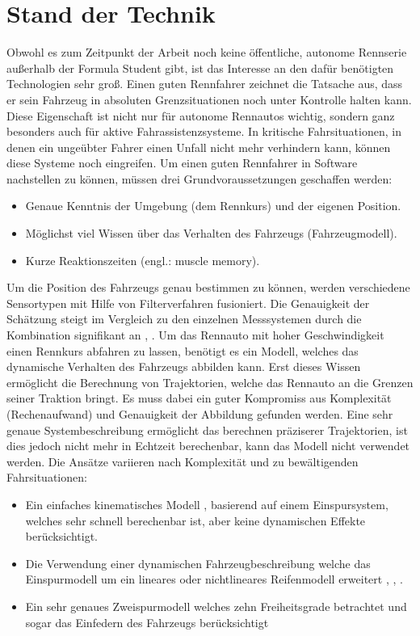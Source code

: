 \documentclass{like}
\begin{document}
\chapter{Stand der Technik}
Obwohl es zum Zeitpunkt der Arbeit noch keine öffentliche, autonome Rennserie außerhalb der Formula Student gibt, ist das Interesse an den dafür benötigten Technologien sehr groß.
Einen guten Rennfahrer zeichnet die Tatsache aus, dass er sein Fahrzeug in absoluten Grenzsituationen noch unter Kontrolle halten kann. Diese Eigenschaft ist nicht nur für autonome Rennautos wichtig, sondern ganz besonders auch für aktive Fahrassistenzsysteme. In kritische Fahrsituationen, in denen ein ungeübter Fahrer einen Unfall nicht mehr verhindern kann, können diese Systeme noch eingreifen. Um einen guten Rennfahrer in Software nachstellen zu können, müssen drei Grundvoraussetzungen geschaffen werden:
\begin{itemize}
	\item Genaue Kenntnis der Umgebung (dem Rennkurs) und der eigenen Position.
	\item Möglichst viel Wissen über das Verhalten des Fahrzeugs (Fahrzeugmodell).
	\item Kurze Reaktionszeiten (engl.: muscle memory).
\end{itemize}

Um die Position des Fahrzeugs genau bestimmen zu können, werden verschiedene Sensortypen mit Hilfe von Filterverfahren fusioniert. Die Genauigkeit der Schätzung steigt im Vergleich zu den einzelnen Messsystemen durch die Kombination signifikant an \cite{GPS_Fusion}, \cite{GPS_IMU_Fusion}. 
Um das Rennauto mit hoher Geschwindigkeit einen Rennkurs abfahren zu lassen, benötigt es ein Modell, welches das dynamische Verhalten des Fahrzeugs abbilden kann. Erst dieses Wissen ermöglicht die Berechnung von Trajektorien, welche das Rennauto an die Grenzen seiner Traktion bringt. Es muss dabei ein guter Kompromiss aus Komplexität (Rechenaufwand) und Genauigkeit der Abbildung gefunden werden.
Eine sehr genaue Systembeschreibung ermöglicht das berechnen präziserer Trajektorien, ist dies jedoch nicht mehr in Echtzeit berechenbar, kann das Modell nicht verwendet werden.
Die Ansätze variieren nach Komplexität und zu bewältigenden Fahrsituationen:
\begin{itemize}
	\item Ein einfaches kinematisches Modell \cite{MPC_Kinetic}, basierend auf einem Einspursystem, welches sehr schnell berechenbar ist, aber keine dynamischen Effekte berücksichtigt.
	\item Die Verwendung einer dynamischen Fahrzeugbeschreibung welche das Einspurmodell um ein lineares oder nichtlineares Reifenmodell erweitert \cite{rc_car_1_43}, \cite{MPC_Dynamic}, \cite{MPC_Dynamic_Tire_Model}.
	\item Ein sehr genaues Zweispurmodell welches zehn Freiheitsgrade betrachtet und sogar das Einfedern des Fahrzeugs berücksichtigt \cite{doi:10.1137/S0036144502414942} \\

\end{itemize}
\end{document}
